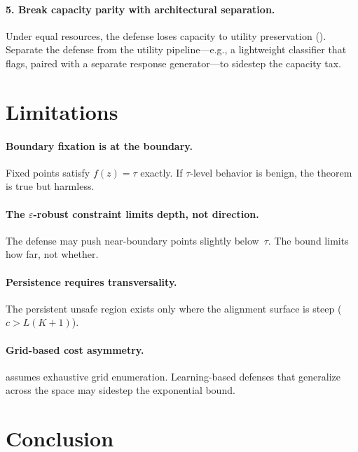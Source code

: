 \documentclass[11pt]{article}
\begin{document}
\paragraph{5. Break capacity parity with architectural separation.}
Under equal resources, the defense loses capacity to utility
preservation (). Separate the defense from the
utility pipeline---e.g., a lightweight classifier that flags, paired
with a separate response generator---to sidestep the capacity tax.


\section{Limitations}
\label{sec:limitations}

\paragraph{Boundary fixation is at the boundary.}
Fixed points satisfy $f(z) = \tau$ exactly. If $\tau$-level behavior
is benign, the theorem is true but harmless.

\paragraph{The $\varepsilon$-robust constraint limits depth, not direction.}
The defense may push near-boundary points slightly below~$\tau$. The
bound limits how far, not whether.

\paragraph{Persistence requires transversality.}
The persistent unsafe region exists only where the alignment surface
is steep ($c > L(K{+}1)$).

\paragraph{Grid-based cost asymmetry.}
 assumes exhaustive grid enumeration. Learning-based
defenses that generalize across the space may sidestep the exponential
bound.


\section{Conclusion}
\label{sec:conclusion}
\end{document}
